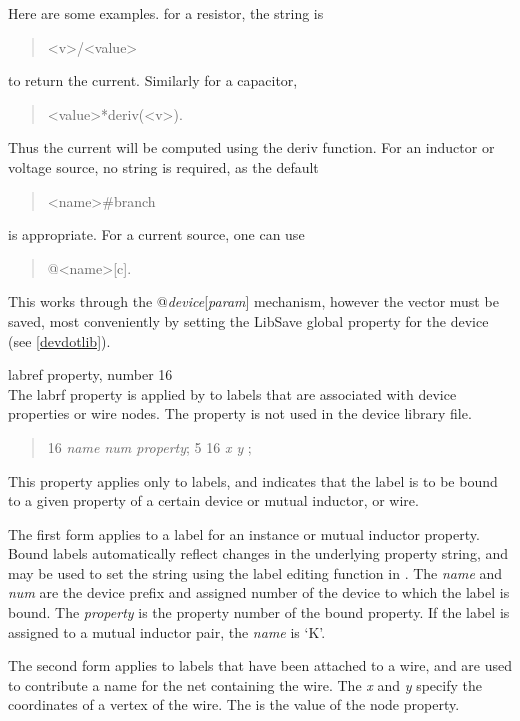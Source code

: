 \begin{description}
Here are some examples.
for a resistor, the string is
\begin{quote}
 {\vt <v>/<value>}
\end{quote}
to return the current.  Similarly for a capacitor,
\begin{quote}
 {\vt <value>*deriv(<v>)}.
\end{quote}
Thus the current will be computed using the {\WRspice} {\vt deriv}
function.  For an inductor or voltage source, no string is required,
as the default
\begin{quote}
 {\vt <name>\#branch}
\end{quote}
is appropriate.  For a current source, one can use
\begin{quote}
 {\vt @<name>[c]}.
\end{quote}
This works through the {\WRspice} {\vt @{\it device\/}[{\it param\/}]}
mechanism, however the vector must be saved, most conveniently by
setting the {\et LibSave} global property for the device (see
\ref{devdotlib}).

\item{\et labref} property, number 16\\
The {\et labrf} property is applied by {\Xic} to labels that are
associated with device properties or wire nodes.  The property is not
used in the device library file.

\begin{quote} 16 {\it name num property\/};
5 16 {\it x y} {};
\end{quote}
This property applies only to labels, and indicates that the label is
to be bound to a given property of a certain device or mutual
inductor, or wire.

The first form applies to a label for an instance or mutual inductor
property.  Bound labels automatically reflect changes in the
underlying property string, and may be used to set the string using
the label editing function in {\Xic}.  The {\it name} and {\it num}
are the device prefix and assigned number of the device to which the
label is bound.  The {\it property} is the property number of the
bound property.  If the label is assigned to a mutual inductor pair,
the {\it name} is `{\vt K}'.

The second form applies to labels that have been attached to a wire,
and are used to contribute a name for the net containing the wire. 
The {\it x} and {\it y} specify the coordinates of a vertex of the
wire.  The {} is the value of the {\et node} property.


\end{description}
